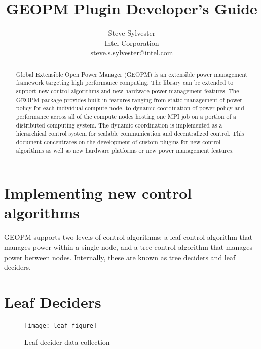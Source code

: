 \documentclass[11pt]{article}
\begin{document}
\sloppy
\title{GEOPM Plugin Developer's Guide}
\author{Steve Sylvester\\
        Intel Corporation\\
        \small{steve.s.sylvester@intel.com}}
\maketitle
\begin{abstract}
Global Extensible Open Power Manager (GEOPM) is an extensible
power management framework targeting high performance computing. The
library can be extended to support new control algorithms and new
hardware power management features. The GEOPM package provides built-in
features ranging from static management of power policy for each
individual compute node, to dynamic coordination of power policy and
performance across all of the compute nodes hosting one MPI job on a
portion of a distributed computing system. The dynamic coordination is
implemented as a hierarchical control system for scalable
communication and decentralized control. This document concentrates on
the development of custom plugins for new control algorithms as well
as new hardware platforms or new power management features.
\end{abstract}

\section{Implementing new control algorithms}
GEOPM supports two levels of control algorithms: a leaf control
algorithm that manages power within a single node, and a tree control
algorithm that manages power between nodes. Internally, these are known
as tree deciders and leaf deciders.

\section{Leaf Deciders}
\begin{figure} [H]
  \centering
  \texttt{[image: leaf-figure]}
  \caption{Leaf decider data collection}
  \label{fig:leaf}
\end{figure}
\end{document}
